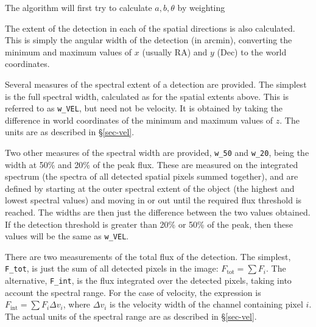 The algorithm will first try to calculate $a,b,\theta$ by weighting



The extent of the detection in each of the spatial directions is also
calculated. This is simply the angular width of the detection (in
arcmin), converting the minimum and maximum values of $x$ (usually RA)
and $y$ (Dec) to the world coordinates.


Several measures of the spectral extent of a detection are
provided. The simplest is the full spectral width, calculated as for
the spatial extents above. This is referred to as \texttt{w\_VEL}, but
need not be velocity. It is obtained by taking the difference in world
coordinates of the minimum and maximum values of $z$. The units are as
described in \S\ref{sec-vel}.

Two other measures of the spectral width are provided, \texttt{w\_50}
and \texttt{w\_20}, being the width at 50\% and 20\% of the peak
flux. These are measured on the integrated spectrum (\ie the spectra
of all detected spatial pixels summed together), and are defined by
starting at the outer spectral extent of the object (the highest and
lowest spectral values) and moving in or out until the required flux
threshold is reached. The widths are then just the difference between
the two values obtained. If the detection threshold is greater than
20\% or 50\% of the peak, then these values will be the same as
\texttt{w\_VEL}.

\label{sec-fluxparams}


There are two measurements of the total flux of the detection. The
simplest, \texttt{F\_tot}, is just the sum of all detected pixels in
the image: $F_\text{tot}=\sum F_i$. The alternative, \texttt{F\_int},
is the flux integrated over the detected pixels, taking into account
the spectral range. For the case of velocity, the expression is
$F_\text{int} = \sum F_i \Delta v_i$, where $\Delta v_i$ is the
velocity width of the channel containing pixel $i$. The actual units
of the spectral range are as described in \S\ref{sec-vel}.

